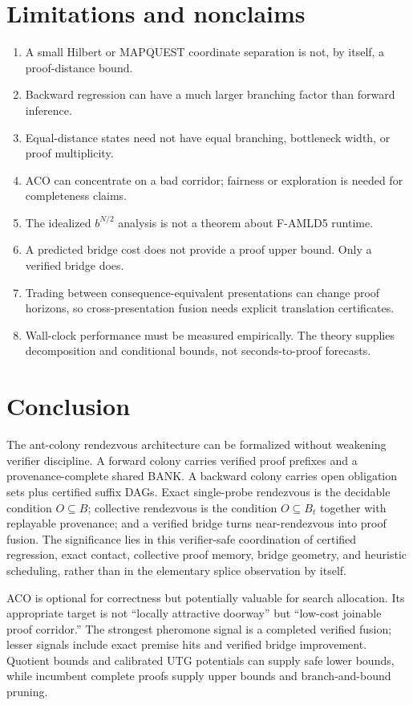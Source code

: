 \documentclass[11pt]{article}
\begin{document}
\section{Limitations and nonclaims}

\begin{enumerate}
\item A small Hilbert or MAPQUEST coordinate separation is not, by itself, a proof-distance bound.
\item Backward regression can have a much larger branching factor than forward inference.
\item Equal-distance states need not have equal branching, bottleneck width, or proof multiplicity.
\item ACO can concentrate on a bad corridor; fairness or exploration is needed for completeness claims.
\item The idealized $b^{N/2}$ analysis is not a theorem about F-AMLD5 runtime.
\item A predicted bridge cost does not provide a proof upper bound. Only a verified bridge does.
\item Trading between consequence-equivalent presentations can change proof horizons, so cross-presentation fusion needs explicit translation certificates.
\item Wall-clock performance must be measured empirically. The theory supplies decomposition and conditional bounds, not seconds-to-proof forecasts.
\end{enumerate}

\section{Conclusion}

The ant-colony rendezvous architecture can be formalized without weakening verifier discipline. A forward colony carries verified proof prefixes and a provenance-complete shared BANK. A backward colony carries open obligation sets plus certified suffix DAGs. Exact single-probe rendezvous is the decidable condition $O\subseteq B$; collective rendezvous is the condition $O\subseteq B_t$ together with replayable provenance; and a verified bridge turns near-rendezvous into proof fusion. The significance lies in this verifier-safe coordination of certified regression, exact contact, collective proof memory, bridge geometry, and heuristic scheduling, rather than in the elementary splice observation by itself.

ACO is optional for correctness but potentially valuable for search allocation. Its appropriate target is not ``locally attractive doorway'' but ``low-cost joinable proof corridor.'' The strongest pheromone signal is a completed verified fusion; lesser signals include exact premise hits and verified bridge improvement. Quotient bounds and calibrated UTG potentials can supply safe lower bounds, while incumbent complete proofs supply upper bounds and branch-and-bound pruning.
\end{document}
